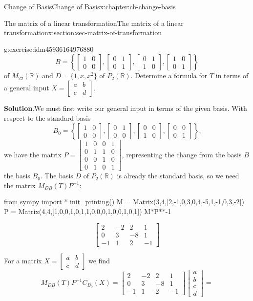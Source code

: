 \documentclass[oneside,10pt,]{book}
\newcommand{\blocktitlefont}{\relax}
\numberwithin{equation}{section}
\newcommand{\bbm}{\begin{bmatrix}}
\newcommand{\ebm}{\end{bmatrix}}
\newcommand{\R}{\mathbb{R}}
\newcommand{\amp}{&}
\begin{document}
\begin{chapterptx}{Change of Basis}{}{Change of Basis}{}{}{x:chapter:ch-change-basis}
\begin{sectionptx}{The matrix of a linear transformation}{}{The matrix of a linear transformation}{}{}{x:section:sec-matrix-of-transformation}
\begin{inlineexercise}{}{g:exercise:idm45936164976880}
\begin{equation*}
B = \left\{\bbm 1\amp 0\\0\amp 0\ebm, \bbm 0\amp 1\\0\amp 1\ebm, \bbm 0\amp 1\\1\amp 0\ebm, \bbm 1\amp 0\\0\amp 1\ebm\right\}
\end{equation*}
of \(M_{22}(\R)\) and \(D=\{1,x,x^2\}\) of \(P_2(\R)\). Determine a formula for \(T\) in terms of a general input \(X=\bbm a\amp b\\c\amp d\ebm\).%
\par\smallskip%
\noindent\textbf{\blocktitlefont Solution}.\label{g:solution:idm45936164972944}{}\hypertarget{g:solution:idm45936164972944}{}\quad{}We must first write our general input in terms of the given basis. With respect to the standard basis%
\begin{equation*}
B_0 = \left\{\bbm 1\amp 0\\0\amp 0\ebm, \bbm 0\amp 1\\0\amp 0\ebm, \bbm 0\amp 0\\1\amp 0\ebm, \bbm 0\amp 0\\0\amp 1\ebm\right\}\text{,}
\end{equation*}
we have the matrix \(P = \bbm 1\amp 0\amp 0\amp 1\\0\amp 1\amp 1\amp 0\\0\amp 0\amp 1\amp 0\\0\amp 1\amp 0\amp 1\ebm\), representing the change from the basis \(B\) the basis \(B_0\). The basis \(D\) of \(P_2(\R)\) is already the standard basis, so we need the matrix \(M_{DB}(T)P^{-1}\):%
\begin{sageinput}
from sympy import *
init_printing()
M = Matrix(3,4,[2,-1,0,3,0,4,-5,1,-1,0,3,-2])
P = Matrix(4,4,[1,0,0,1,0,1,1,0,0,0,1,0,0,1,0,1])
M*P**-1
\end{sageinput}
\begin{sageoutput}
\[\bbm 2\amp -2\amp 2\amp 1\\0\amp 3\amp -8\amp 1\\-1\amp 1\amp 2\amp -1\ebm\]
\end{sageoutput}
For a matrix \(X = \bbm a\amp b\\c\amp d\ebm\) we find%
\begin{equation*}
M_{DB}(T)P^{-1}C_{B_0}(X)=\bbm 2\amp -2\amp 2\amp 1\\0\amp 3\amp -8\amp 1\\-1\amp 1\amp 2\amp -1\ebm\bbm a\\b\\c\\d\ebm =

\end{equation*}
\end{inlineexercise}
\end{sectionptx}
\end{chapterptx}
\end{document}
